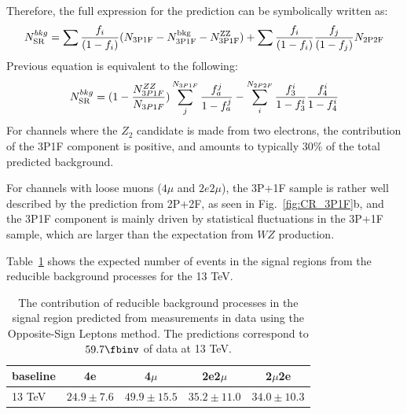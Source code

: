 Therefore, the
full expression for the prediction can be symbolically written as:
%
\begin{equation} 
\label{eq:PredictionSR}
N^{bkg}_{\rm SR} = \sum \frac{f_{i}}{(1-f_{i})} (N_{\rm 3P1F} - N^{\rm
bkg}_{\rm 3P1F} - N^{\rm ZZ}_{\rm 3P1F})
+ \sum \frac{f_{i}}{(1-f_{i})} \frac{f_{j}}{(1-f_{j})}N_{\rm 2P2F} \end{equation}
Previous equation is equivalent to the following:
\begin{equation}
\label{eq:PredictionSR2}
N^{bkg}_{\rm SR}= (1-\frac{N_{3P1F}^{ZZ}}{N_{3P1F}})\sum_j^{N_{3P1F}}\frac{f_a^j}{1-f_a^j} - \sum_i^{N_{2P2F}}\frac{f_3^i}{1-f_3^i}\frac{f_4^i}{1-f_4^i}
\end{equation}
For channels where the $Z_2$ candidate is made from two electrons, 
the contribution of the 3P1F component is 
positive, and amounts to typically $30 \%$ of the total predicted background.

For channels with loose muons ($4\mu$ and $2e2\mu$), the 3P+1F sample is rather well described by
the prediction from 2P+2F, as seen in Fig.~\ref{fig:CR_3P1F}b, and the
3P1F component is mainly driven by statistical fluctuations in the 3P+1F sample,
which are larger than the expectation from $WZ$ production.





Table~\ref{tab:reducibleMethodA} shows the expected number of
events in the signal regions from the reducible background processes for the 13 TeV. 

\begin{table}[h]
\begin{center}
     \begin{tabular}{| l | c | c | c | c |} \hline
 baseline	& 4e 	 & 4$\mu$ & 2e2$\mu$  & 2$\mu$2e   \\ \hline \hline
13 TeV & $ 24.9 \pm 7.6 $ & $49.9 \pm 15.5$ & $35.2 \pm 11.0$ & $34.0 \pm 10.3$ \\ \hline
 	\end{tabular}
\end{center}
    \caption{ The contribution of reducible background
    processes in the signal region predicted from measurements in data
    using the Opposite-Sign Leptons method. The predictions correspond to $\usedLumiC$ of data at 13 TeV.}
     \label{tab:reducibleMethodA}
\end{table}
